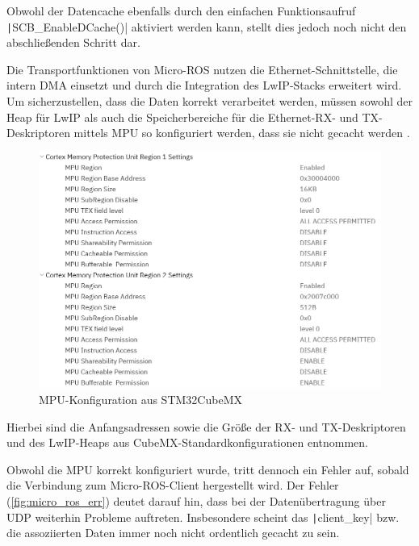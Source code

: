 Obwohl der Datencache ebenfalls durch den einfachen Funktionsaufruf
\texttt|SCB_EnableDCache()| aktiviert werden kann, stellt dies jedoch
noch nicht den abschließenden Schritt dar.

Die Transportfunktionen von Micro-ROS nutzen die Ethernet-Schnittstelle, die
intern DMA einsetzt und durch die Integration des \ac{LwIP}-Stacks erweitert
wird. Um sicherzustellen, dass die Daten korrekt verarbeitet werden, müssen
sowohl der Heap für LwIP als auch die Speicherbereiche für die Ethernet-RX- und
TX-Deskriptoren mittels \ac{MPU} so konfiguriert werden, dass sie nicht gecacht
werden \cite{STM32H7_LwIP_Examples}.

\begin{figure}[H]
    \centering
    \includegraphics[width=1\textwidth]{assets/mpu_conf_cubemx}
    \caption{MPU-Konfiguration aus STM32CubeMX}
\end{figure}

Hierbei sind die Anfangsadressen sowie die Größe der RX- und TX-Deskriptoren
und des LwIP-Heaps aus CubeMX-Standardkonfigurationen entnommen.

Obwohl die MPU korrekt konfiguriert wurde, tritt dennoch ein Fehler auf, sobald
die Verbindung zum Micro-ROS-Client hergestellt wird. Der Fehler
(\ref{fig:micro_ros_err}) deutet darauf hin, dass bei der Datenübertragung über
UDP weiterhin Probleme auftreten. Insbesondere scheint das
\texttt|client_key| bzw. die assoziierten Daten immer noch nicht
ordentlich gecacht zu sein.

